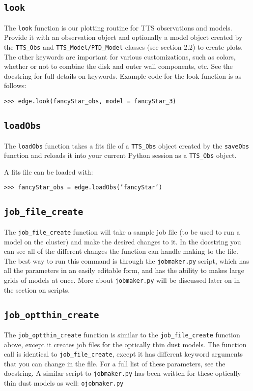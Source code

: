 \documentclass{article}
\begin{document}
\subsection{\texttt{look}}
 
\noindent The \texttt{look} function is our plotting routine for TTS observations and models. Provide it with an observation object and optionally a model object created by the \texttt{TTS\_Obs} and \texttt{TTS\_Model}\texttt{/PTD\_Model} classes (see section 2.2) to create plots. The other keywords are important for various customizations, such as colors, whether or not to combine the disk and outer wall components, etc. See the docstring for full details on keywords. Example code for the look function is as follows:

\vspace{2mm}
\texttt{>>> edge.look(fancyStar\_obs, model = fancyStar\_3)}
\vspace{2mm}

\subsection{\texttt{loadObs}}

\noindent The \texttt{loadObs} function takes a fits file of a \texttt{TTS\_Obs} object created by the \texttt{saveObs} function and reloads it into your current Python session as a \texttt{TTS\_Obs} object. 

A fits file can be loaded with:

\vspace{2mm}
\texttt{>>> fancyStar\_obs = edge.loadObs('fancyStar')}
\vspace{2mm}

\subsection{\texttt{job\_file\_create}}

\noindent The \texttt{job\_file\_create} function will take a sample job file (to be used to run a model on the cluster) and make the desired changes to it. In the docstring you can see all of the different changes the function can handle making to the file. The best way to run this command is through the \texttt{jobmaker.py} script, which has all the parameters in an easily editable form, and has the ability to makes large grids of models at once. More about \texttt{jobmaker.py} will be discussed later on in the section on scripts.


\subsection{\texttt{job\_optthin\_create}}
\noindent The \texttt{job\_optthin\_create} function is similar to the \texttt{job\_file\_create} function above, except it creates job files for the optically thin dust models. The function call is identical to \texttt{job\_file\_create}, except it has different keyword arguments that you can change in the file. For a full list of these parameters, see the docstring. A similar script to \texttt{jobmaker.py} has been written for these optically thin dust models as well: \texttt{ojobmaker.py}
\end{document}
